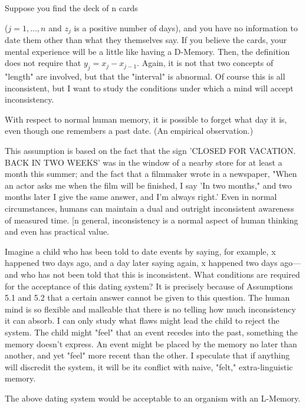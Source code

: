 \documentclass[10pt,twoside]{memoir}
\begin{document}
\begin{enumerate}
{\begin{enumerate}
\begin{sysrules}
\begin{sysrules}
\begin{sysrules}
\begin{sysrules}
{\begin{enumerate}
Suppose you find the deck of n cards 

{\centering
{}
\par}


($j=1,...,n$ and $z_j$ is a positive number of days), and you have no 
information to date them other than what they themselves say. If you 
believe the cards, your mental experience will be a little like having a 
D-Memory. Then, the definition does not require that $y_j=x_j-x_{j-1}$. Again, it is 
not that two concepts of "length" are involved, but that the "interval" is 
abnormal. Of course this is all inconsistent, but I want to study the 
conditions under which a mind will accept inconsistency. 

 With respect to normal human memory, it is possible 
to forget what day it is, even though one remembers a past date. (An 
empirical observation.) 

 This assumption is based on the fact that the sign 
'CLOSED FOR VACATION. BACK IN TWO WEEKS' was in the window of 
a nearby store for at least a month this summer; and the fact that a 
filmmaker wrote in a newspaper, "When an actor asks me when the film will 
be finished, I say 'In two months," and two months later I give the same 
answer, and I'm always right.' Even in normal circumstances, humans can 
maintain a dual and outright inconsistent awareness of measured time. [n 
general, inconsistency is a normal aspect of human thinking and even has 
practical value. 

Imagine a child who has been told to date events by saying, for 
example, x happened two days ago, and a day later saying again, x happened 
two days ago---and who has not been told that this is inconsistent. What 
conditions are required for the acceptance of this dating system? It is 
precisely because of Assumptions 5.1 and 5.2 that a certain answer cannot 
be given to this question. The human mind is so flexible and malleable that 
there is no telling how much inconsistency it can absorb. I can only study 
what flaws might lead the child to reject the system. The child might "feel" 
that an event recedes into the past, something the memory doesn't express. 
An event might be placed by the memory no later than another, and yet 
"feel" more recent than the other. I speculate that if anything will discredit 
the system, it will be its conflict with naive, "felt," extra-linguistic memory. 

 The above dating system would be acceptable to an 
organism with an L-Memory. 


\end{enumerate}}
\end{sysrules}
\end{sysrules}
\end{sysrules}
\end{sysrules}
\end{enumerate}}
\end{enumerate}
\end{document}

